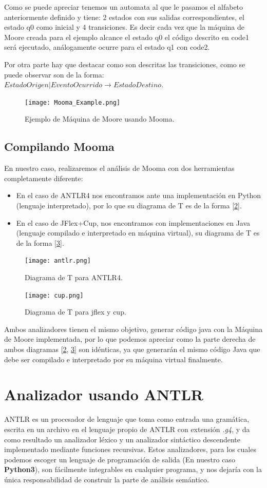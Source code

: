 \documentclass{pre-tfg}
\begin{document}
Como se puede apreciar tenemos un automata al que le pasamos el alfabeto anteriormente definido y tiene: 2 estados con sus salidas correspondientes, el estado q0 como inicial y 4 transiciones. Es decir cada vez que la máquina de Moore creada para el ejemplo alcance el estado q0 el código descrito en code1 será ejecutado, análogamente ocurre para el estado q1 con code2.

Por otra parte hay que destacar como son descritas las transiciones, como se puede observar son de la forma: $ EstadoOrigen|EventoOcurrido \rightarrow EstadoDestino $.



\begin{figure}[htb]
	\centering
	\texttt{[image: Mooma\_Example.png]}
	\caption{Ejemplo de Máquina de Moore usando Mooma.}
	\label{fig:MoomaExample1}
\end{figure}
\subsection{Compilando Mooma}
En nuestro caso, realizaremos el análisis de Mooma con dos herramientas completamente diferente:
\begin{itemize}
    \item En el caso de ANTLR4 nos encontramos ante una implementación en Python (lenguaje interpretado), por lo que su diagrama de T es de la forma [\ref{fig:pythonDiagrama}].
    \item En el caso de JFlex+Cup, nos encontramos con implementaciones en Java (lenguaje compilado e interpretado en máquina virtual), su diagrama de T es de la forma [\ref{fig:flexcupDiagrama}].
\end{itemize}
\begin{figure}[htb]
	\centering
	\texttt{[image: antlr.png]}
	\caption{Diagrama de T para ANTLR4.}
	\label{fig:pythonDiagrama}
\end{figure}
\begin{figure}[htb]
	\centering
	\texttt{[image: cup.png]}
	\caption{Diagrama de T para jflex y cup.}
	\label{fig:flexcupDiagrama}
\end{figure}
Ambos analizadores tienen el mismo objetivo, generar código java con la Máquina de Moore implementada, por lo que podemos apreciar como la parte derecha de ambos diagramas [\ref{fig:pythonDiagrama}, \ref{fig:flexcupDiagrama}] son idénticas, ya que generarán el mismo código Java que debe ser compilado e interpretado por su máquina virtual finalmente.
\section{Analizador usando ANTLR}
ANTLR es un procesador de lenguaje que toma como entrada una gramática, escrita en un archivo en el lenguaje propio de ANTLR con extensión \textit{.g4}, y da como resultado un analizador léxico y un analizador sintáctico descendente implementado mediante funciones recursivas. Estos analizadores, para los cuales podemos escoger un lenguaje de programación de salida (En nuestro caso \textbf{Python3}), son fácilmente integrables en cualquier programa, y nos dejaría con la única responsabilidad de construir la parte de análisis semántico.
\end{document}
